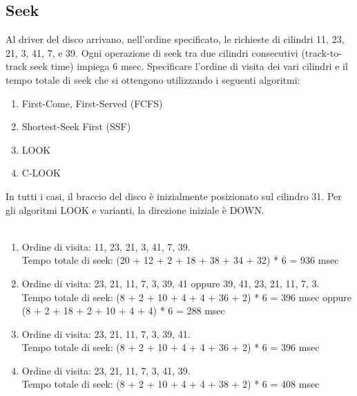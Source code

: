 \documentclass[12pt]{article}
\begin{document}
\subsection{Seek}
Al driver del disco arrivano, nell'ordine specificato, le richieste di cilindri 11, 23, 21, 3, 41, 7, e 39.
Ogni operazione di seek tra due cilindri consecutivi (track-to-track seek time) impiega 6 msec.
Specificare l'ordine di visita dei vari cilindri e il tempo totale di seek che si ottengono utilizzando i
seguenti algoritmi:
\begin{enumerate}
    \item First-Come, First-Served (FCFS)
    \item Shortest-Seek First (SSF)
    \item LOOK
    \item C-LOOK
\end{enumerate}
In tutti i casi, il braccio del disco è inizialmente posizionato sul cilindro 31. Per gli algoritmi LOOK
e varianti, la direzione iniziale è DOWN.\\\\
\begin{enumerate}
    \color{blue}
    \item Ordine di visita: 11, 23, 21, 3, 41, 7, 39.\\ Tempo totale di seek: (20 + 12 + 2 + 18 + 38 + 34 + 32) * 6 =  936 msec
    \item Ordine di visita: 23, 21, 11, 7, 3, 39, 41 oppure 39, 41, 23, 21, 11, 7, 3. \\Tempo totale di seek: (8 + 2 + 10 + 4 + 4 + 36 + 2) * 6 = 396 msec oppure (8 + 2 + 18 + 2 + 10 + 4 + 4) * 6 = 288 msec
    \item Ordine di visita: 23, 21, 11, 7, 3, 39, 41. \\Tempo totale di seek: (8 + 2 + 10 + 4 + 4 + 36 + 2) * 6 = 396 msec
    \item Ordine di visita: 23, 21, 11, 7, 3, 41, 39. \\Tempo totale di seek: (8 + 2 + 10 + 4 + 4 + 38 + 2) * 6 = 408 msec
\end{enumerate}
\end{document}
